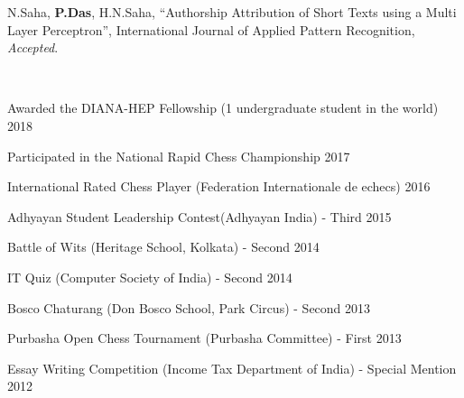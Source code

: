 \documentclass[10pt, letterpaper]{deps1}
\begin{document}
%
%
\small{\begin{tightitemize}
    \item N.Saha, {\textbf{P.Das}}, H.N.Saha, ``Authorship Attribution of Short Texts using a Multi Layer Perceptron'', International Journal of Applied Pattern Recognition, {\textit{Accepted}}.
\end{tightitemize}}

%
%
\\
\vspace{5pt}

%
%
\begin{tightitemize}
	\item Awarded the DIANA-HEP Fellowship (1 undergraduate student in the world) \hfill{2018}
	\item Participated in the National Rapid Chess Championship \hfill{2017}
	\item International Rated Chess Player (Federation Internationale de echecs) \hfill{2016}
	\item Adhyayan Student Leadership Contest(Adhyayan India) - Third \hfill{2015}
	\item Battle of Wits (Heritage School, Kolkata) - Second \hfill{2014}
	\item IT Quiz (Computer Society of India) - Second \hfill{2014}
	\item Bosco Chaturang (Don Bosco School, Park Circus) - Second \hfill{2013}
	\item Purbasha Open Chess Tournament (Purbasha Committee) - First \hfill{2013}
	\item Essay Writing Competition (Income Tax Department of India) - Special Mention \hfill{2012}
\end{tightitemize}
\end{document}
